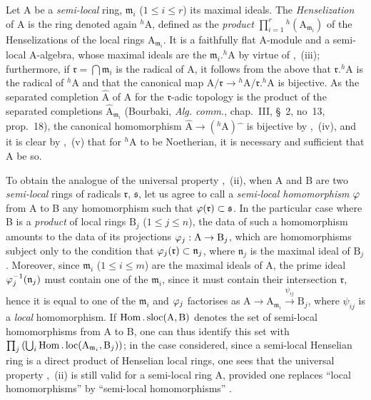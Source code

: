 \begin{env}[18.6.7]
\label{IV.18.6.7}
Let A be a \emph{semi-local} ring, $\mathfrak{m}_i$ ($1\leq i\leq r$) its maximal ideals.
The \emph{Henselization} of A is the ring denoted again ${}^h\!\mathrm{A}$, defined as the \emph{product} $\prod_{i=1}^r{}^h(\mathrm{A}_{\mathfrak{m}_i})$ of the Henselizations of the local rings $\mathrm{A}_{\mathfrak{m}_i}$.
It is a faithfully flat A-module and a semi-local A-algebra, whose maximal ideals are the $\mathfrak{m}_i.{}^h\!\mathrm{A}$ by virtue of ,~(iii);
furthermore, if $\mathfrak{r}=\bigcap\mathfrak{m}_i$ is the radical of A, it follows from the above that $\mathfrak{r}.{}^h\!\mathrm{A}$
is the radical of ${}^h\!\mathrm{A}$ and that the canonical map $\mathrm{A}/\mathfrak{r}\to{}^h\!\mathrm{A}/\mathfrak{r}.{}^h\!\mathrm{A}$ is bijective.
As the separated completion $\hat{\mathrm{A}}$ of A for the $\mathfrak{r}$-adic topology is the product of the separated completions $\hat{\mathrm{A}}_{\mathfrak{m}_i}$ (Bourbaki, \emph{Alg. comm.}, chap.~III, \S~2, no~13, prop.~18), the canonical homomorphism $\hat{\mathrm{A}}\to({}^h\!\mathrm{A})\hat{\phantom{x}}$ is bijective by ,~(iv), and it is clear by ,~(v) that for ${}^h\!\mathrm{A}$ to be Noetherian, it is necessary and sufficient that A be so.

To obtain the analogue of the universal property ,~(ii), when A and B are two \emph{semi-local} rings of radicals $\mathfrak{r}$, $\mathfrak{s}$, let us agree to call a \emph{semi-local homomorphism} $\varphi$ from A to B any homomorphism such that $\varphi(\mathfrak{r})\subset\mathfrak{s}$.
In the particular case where B is a \emph{product} of local rings $\mathrm{B}_j$ ($1\leq j\leq n$), the data of such a homomorphism amounts to the data of its projections $\varphi_j:\mathrm{A}\to\mathrm{B}_j$, which are homomorphisms subject only to the condition that $\varphi_j(\mathfrak{r})\subset\mathfrak{n}_j$, where $\mathfrak{n}_j$ is the maximal ideal of $\mathrm{B}_j$.
Moreover, since $\mathfrak{m}_i$ ($1\leq i\leq m$) are the maximal ideals of A, the prime ideal $\varphi_j^{-1}(\mathfrak{n}_j)$ must contain one of the $\mathfrak{m}_i$, since it must contain their intersection $\mathfrak{r}$, hence it is equal to one of the $\mathfrak{m}_i$ and $\varphi_j$ factorises as $\mathrm{A}\to\mathrm{A}_{\mathfrak{m}_i}\xrightarrow{\psi_{ij}}\mathrm{B}_j$, where $\psi_{ij}$ is a \emph{local} homomorphism.
If $\operatorname{Hom}.\operatorname{sloc}(\mathrm{A},\mathrm{B})$ denotes the set of semi-local homomorphisms from A to B, one can thus identify this set with $\prod_j\left(\bigcup_i\operatorname{Hom}.\operatorname{loc}(\mathrm{A}_{\mathfrak{m}_i},\mathrm{B}_j)\right)$;
in the case considered, since a semi-local Henselian ring is a direct product of Henselian local rings, one sees that the universal property ,~(ii) is still valid for a semi-local ring A, provided one replaces ``local homomorphisms'' by ``semi-local homomorphisms'' .
\end{env}

